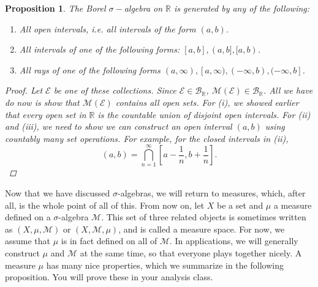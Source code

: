 \documentclass[12pt]{amsart}         %
\newtheorem{proposition}{Proposition}[section]
\theoremstyle{remark}
\newcommand{\R}{\mathbb{R}}
\begin{document}
\begin{proposition}The Borel $\sigma-$algebra on $\R$ is generated by any of the following:
\begin{enumerate}
	\item All open intervals, i.e. all intervals of the form $(a, b)$.
	\item All intervals of one of the following forms: $[a, b], (a, b], [a, b)$.
	\item All rays of one of the following forms $(a, \infty), [a, \infty), (-\infty, b), (-\infty, b]$.
\end{enumerate}
\begin{proof}
Let $\mathcal{E}$ be one of these collections. Since $\mathcal{E} \in \mathcal{B}_\R$, $\mathcal{M}(\mathcal{E}) \in \mathcal{B}_\R$. All we have do now is show that $\mathcal{M}(\mathcal{E})$ contains all open sets. For (i), we showed earlier that every open set in $\R$ is the countable union of disjoint open intervals. For (ii) and (iii), we need to show we can construct an open interval $(a, b)$ using countably many set operations. For example, for the closed intervals in (ii),
\[
(a, b) = \bigcap_{n=1}^\infty \left[ a - \frac{1}{n}, b + \frac{1}{n}  \right].
\]
\end{proof}
\end{proposition}

Now that we have discussed $\sigma$-algebras, we will return to measures, which, after all, is the whole point of all of this. From now on, let $X$ be a set and $\mu$ a measure defined on a $\sigma$-algebra $\mathcal{M}$. This set of three related objects is sometimes written as $(X, \mu, \mathcal{M})$ or $(X, \mathcal{M}, \mu)$, and is called a measure space. For now, we assume that $\mu$ is in fact defined on all of $\mathcal{M}$. In applications, we will generally construct $\mu$ and $\mathcal{M}$ at the same time, so that everyone plays together nicely. A measure $\mu$ has many nice properties, which we summarize in the following proposition. You will prove these in your analysis class.
\end{document}
